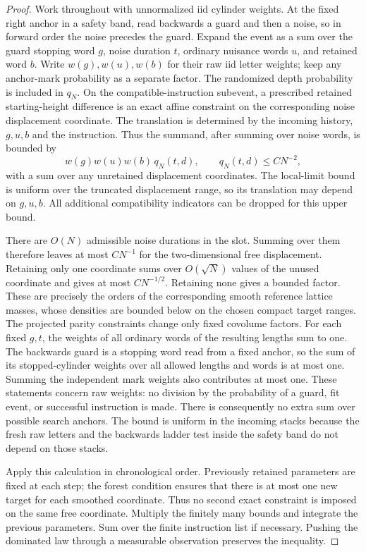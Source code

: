 \begin{proof}
Work throughout with unnormalized iid cylinder weights.  At the fixed
right anchor in a safety band, read backwards a guard and then a noise,
so in forward order the noise precedes the guard.  Expand the event as
a sum over the guard stopping word $g$, noise duration $t$, ordinary
nuisance words $u$, and retained word $b$.  Write $w(g),w(u),w(b)$ for
their raw iid letter weights; keep any anchor-mark probability as a
separate factor.  The randomized depth probability is included in
$q_N$.  On the compatible-instruction subevent, a prescribed
retained starting-height difference is an exact affine constraint on
the corresponding noise displacement coordinate.  The translation is
determined by the incoming history, $g,u,b$ and the instruction.  Thus
the summand, after summing over noise words, is bounded by
\[
 w(g)w(u)w(b)\,q_N(t,d),
 \qquad q_N(t,d)\le C N^{-2},
\]
with a sum over any unretained displacement coordinates.
The local-limit bound is uniform over the truncated displacement range,
so its translation may depend on $g,u,b$.  All additional compatibility
indicators can be dropped for this upper bound.

There are $O(N)$ admissible noise durations in the slot.  Summing over
them therefore leaves at most $C N^{-1}$ for the two-dimensional free
displacement.  Retaining only one coordinate sums over $O(\sqrt N)$
values of the unused coordinate and gives at most $C N^{-1/2}$.
Retaining none gives a bounded factor.  These are precisely the orders
of the corresponding smooth reference lattice masses, whose densities
are bounded below on the chosen compact target ranges.  The projected
parity constraints change only fixed covolume factors.  For each fixed
$g,t$, the weights of all ordinary words of the resulting lengths sum
to one.  The backwards guard is a stopping word read from a fixed
anchor, so the sum of its stopped-cylinder weights over all allowed
lengths and words is at most one.  Summing the independent mark weights
also contributes at most one.  These statements concern raw weights:
no division by the probability of a guard, fit event, or successful
instruction is made.  There is consequently no extra sum over possible
search anchors.  The bound is uniform
in the incoming stacks because the fresh raw letters and the backwards
ladder test inside the safety band do not depend on those stacks.

Apply this calculation in chronological order.  Previously retained
parameters are fixed at each step; the forest condition ensures that
there is at most one new target for each smoothed coordinate.  Thus no
second exact constraint is imposed on the same free coordinate.  Multiply
the finitely many bounds and integrate the previous parameters.  Sum
over the finite instruction list if necessary.  Pushing the dominated
law through a measurable observation preserves the inequality.
\end{proof}

